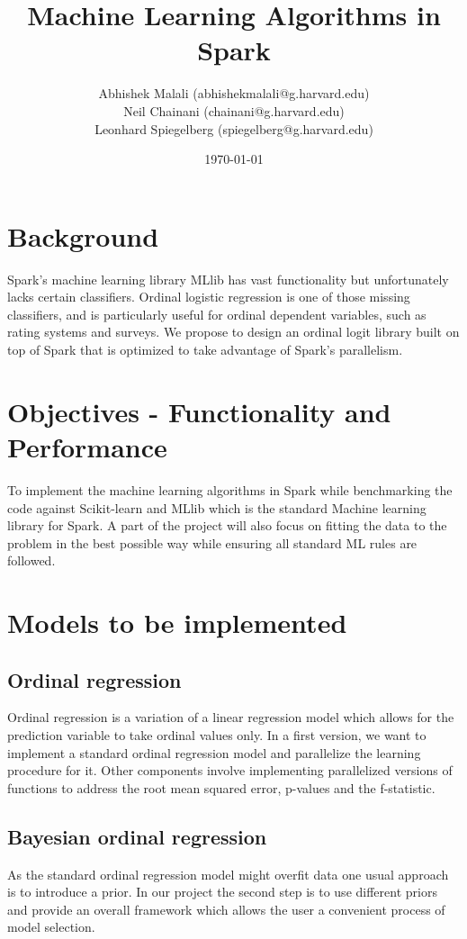\documentclass{article}
\begin{document}
	\title{Machine Learning Algorithms in Spark}
	\author{Abhishek Malali (abhishekmalali@g.harvard.edu)\\
			Neil Chainani (chainani@g.harvard.edu)\\
			Leonhard Spiegelberg (spiegelberg@g.harvard.edu)}
	\date{\today}
	\maketitle
	\section{Background}

	Spark's machine learning library MLlib has vast functionality but unfortunately lacks certain classifiers. Ordinal logistic regression is one of those missing classifiers, and is particularly useful for ordinal dependent variables, such as rating systems and surveys. We propose to design an ordinal logit library built on top of Spark that is optimized to take advantage of Spark's parallelism.


	\section{Objectives - Functionality and Performance}
	To implement the machine learning algorithms in Spark while benchmarking the code against Scikit-learn and MLlib which is the standard Machine learning library for Spark. A part of the project will also focus on fitting the data to the problem in the best possible way while ensuring all standard ML rules are followed.

	\section{Models to be implemented}
	\subsection{Ordinal regression}
	Ordinal regression is a variation of a linear regression model which allows for the prediction variable to take ordinal values only. In a first version, we want to implement a standard ordinal regression model and parallelize the learning procedure for it. Other components involve implementing parallelized versions of functions to address the root mean squared error, p-values and the f-statistic.
	\subsection{Bayesian ordinal regression}
	As the standard ordinal regression model might overfit data one usual approach is to introduce a prior. In our project the second step is to use different priors and provide an overall framework which allows the user a convenient process of model selection.
\end{document}
